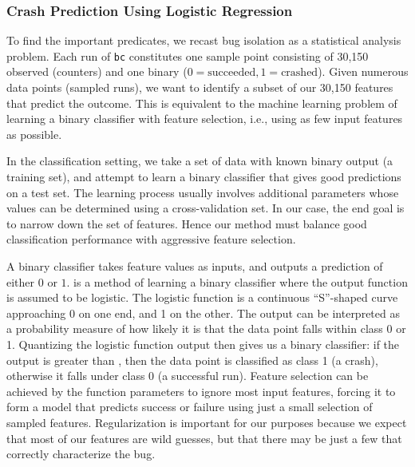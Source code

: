\subsubsection{Crash Prediction Using Logistic Regression}

To find the important predicates, we recast bug isolation as a
statistical analysis problem.  Each run of \texttt{bc} constitutes one
sample point consisting of 30,150 observed 
(counters) and one binary  ($0 = \text{succeeded}, 1
= \text{crashed}$).  Given numerous data points (sampled runs), we
want to identify a subset of our 30,150 features that predict the
outcome.  This is equivalent to the machine learning problem of
learning a binary classifier with feature selection, i.e., using as
few input features as possible.

In the classification setting, we take a set of data with known binary
output (a training set), and attempt to learn a binary classifier that
gives good predictions on a test set.  The learning process usually
involves additional parameters whose values can be determined using a
cross-validation set.  In our case, the end goal is to narrow down the set
of features.  Hence our method must balance good
classification performance with aggressive feature selection.

A binary classifier takes feature values as inputs, and outputs a
prediction of either $0$ or $1$.  
\cite{Hastie01} is a method of learning a binary classifier where the
output function is assumed to be logistic.  The logistic function is a
continuous ``S''-shaped curve approaching 0 on one end, and 1 on the
other.  The output can be interpreted as a probability measure of how
likely it is that the data point falls within class 0 or 1.  Quantizing the
logistic function output then gives us a binary classifier: if the
output is greater than , then the data point is
classified as class 1 (a crash), otherwise it falls under class 0 (a
successful run).  Feature selection can be achieved by
 the function parameters to ignore most input
features, forcing it to form a model that predicts success or failure
using just a small selection of sampled features.  Regularization is
important for our purposes because we expect that most of our features
are wild guesses, but that there may be just a few that correctly
characterize the bug.

